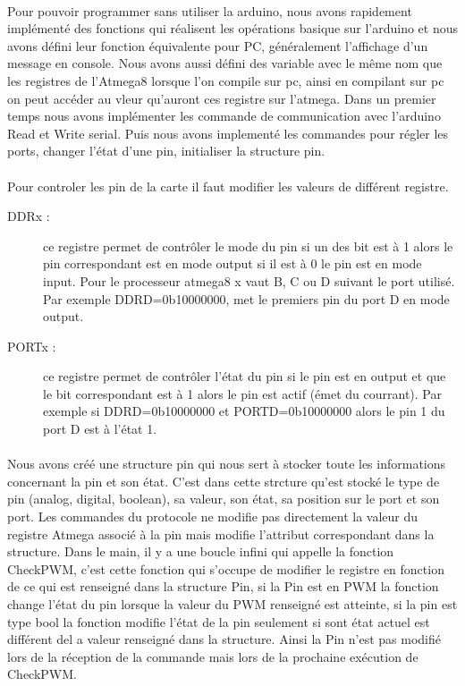 \paragraph{}
Pour pouvoir programmer sans utiliser la arduino, nous avons rapidement implémenté des fonctions qui réalisent les opérations basique sur l'arduino et nous avons défini leur fonction équivalente pour PC, généralement l'affichage d'un message en console. Nous avons aussi défini des variable avec le même nom que les registres de l'Atmega8 lorsque l'on compile sur pc, ainsi en compilant sur pc on peut accéder au vleur qu'auront ces registre sur l'atmega.
Dans un premier temps nous avons implémenter les commande de communication avec l'arduino Read et Write serial. Puis nous avons implementé les commandes pour régler les ports, changer l'état d'une pin, initialiser la structure pin.

\paragraph{}
Pour controler les pin de la carte il faut modifier les valeurs de différent registre.
\begin{description}
\item[DDRx :] ce registre permet de contrôler le mode du pin si un des bit est à 1 alors le pin correspondant est en mode output si il est à 0 le pin est en mode input. Pour le processeur atmega8 x vaut B, C ou D suivant le port utilisé. Par exemple DDRD=0b10000000, met le premiers pin du port D en mode output.
\item[PORTx :] ce registre permet de contrôler l'état du pin si le pin est en output et que le bit correspondant est à 1 alors le pin est actif (émet du courrant). Par exemple si DDRD=0b10000000 et PORTD=0b10000000 alors le pin 1 du port D est à l'état 1.
\end{description}

\paragraph{}
Nous avons créé une structure pin qui nous sert à stocker toute les informations concernant la pin et son état. C'est dans cette strcture qu'est stocké le type de pin (analog, digital, boolean), sa valeur, son état, sa position sur le port et son port. Les commandes du protocole ne modifie pas directement la valeur du registre Atmega associé à la pin mais modifie l'attribut correspondant dans la structure. Dans le main, il y a une boucle infini qui appelle la fonction CheckPWM, c'est cette fonction qui s'occupe de modifier le registre en fonction de ce qui est renseigné dans la structure Pin, si la Pin est en PWM la fonction change l'état du pin lorsque la valeur du PWM renseigné est atteinte, si la pin est type bool la fonction modifie l'état de la pin seulement si sont état actuel est différent del a valeur renseigné dans la structure. Ainsi la Pin n'est pas modifié lors de la réception de la commande mais lors de la prochaine exécution de CheckPWM.

